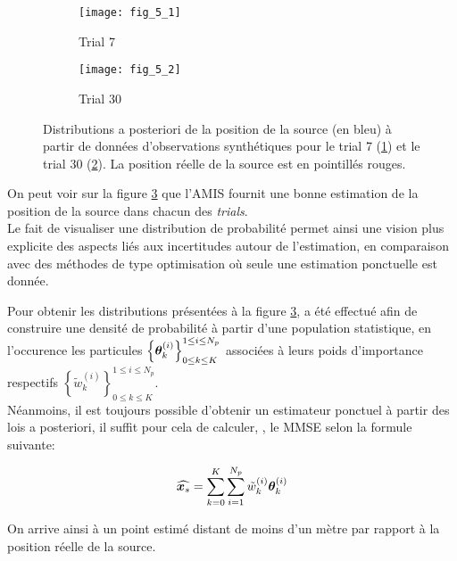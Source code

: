  \begin{figure}[h!]
 	\centering
 	\begin{subfigure}[t]{1\textwidth}
 		\centering
 		\texttt{[image: fig\_5\_1]}
 		\caption{Trial 7}
 		\label{fig_5_1_AE}
 	\end{subfigure}
 	\begin{subfigure}[t]{1\textwidth}
 		\centering
 		\texttt{[image: fig\_5\_2]}
 		\caption{Trial 30}
 		\label{fig_5_2_AE}
 	\end{subfigure}
 	\caption{Distributions a posteriori de la position de la source (en bleu) à partir de données d'observations synthétiques pour le trial 7 (\ref{fig_5_1_AE}) et le trial 30 (\ref{fig_5_2_AE}). La position réelle de la source est en pointillés rouges.}
 	\label{fig_5_AE}
 \end{figure}
 On peut voir sur la figure \ref{fig_5_AE} que l'AMIS fournit une bonne estimation de la position de la source dans chacun des \textit{trials}.\\
 
  Le fait de visualiser une distribution de probabilité permet ainsi une vision plus explicite des aspects liés aux incertitudes autour de l'estimation,  en comparaison avec des méthodes de type optimisation où seule une estimation ponctuelle est donnée.
  
  Pour obtenir les distributions présentées à la figure \ref{fig_5_AE},  a été effectué afin de construire une densité de probabilité à partir d'une population statistique, en l'occurence les particules $\left\{{\bm{\theta}}_k^{(i)}\right\}_{0\leq k \leq K}^{1\leq i \leq N_p}$ associées à leurs poids d'importance respectifs $\left\{\widetilde{w}_k^{(i)}\right\}_{0\leq k \leq K}^{1\leq i \leq N_p}$. \\
  
  
  Néanmoins, il est toujours possible d'obtenir un estimateur ponctuel à partir des lois a posteriori, il suffit pour cela de calculer, , le MMSE selon la formule suivante: 
  
  \begin{equation}
  \widehat{{\bm{x}_s}} = \sum\limits_{k=0}^K\sum\limits_{i=1}^{N_p} \tilde{w}_k^{(i)}{\bm{\theta}}_{k}^{(i)}
  \end{equation}
  
  On arrive ainsi à un point estimé distant de moins d'un mètre par rapport à la position réelle de la source. \\

